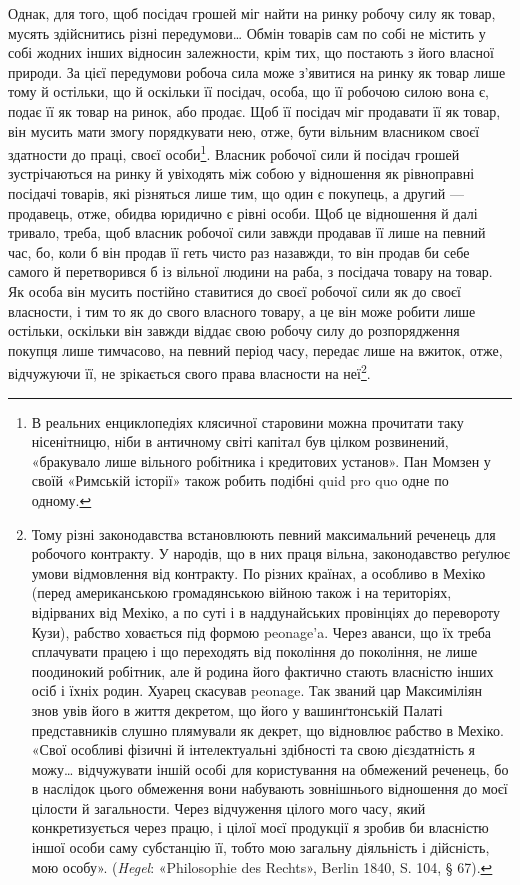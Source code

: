
Однак, для того, щоб посідач грошей міг найти на ринку
робочу силу як товар, мусять здійснитись різні передумови\dots{}
Обмін товарів сам по собі не містить у собі жодних інших відносин
залежности, крім тих, що постають з його власної природи.
За цієї передумови робоча сила може з’явитися на ринку як
товар лише тому й остільки, що й оскільки її посідач, особа, що
її робочою силою вона є, подає її як товар на ринок, або продає.
Щоб її посідач міг продавати її як товар, він мусить мати змогу
порядкувати нею, отже, бути вільним власником своєї здатности
до праці, своєї особи\footnote{
В реальних енциклопедіях клясичної старовини можна прочитати
таку нісенітницю, ніби в античному світі капітал був цілком розвинений,
«бракувало лише вільного робітника і кредитових установ». Пан Момзен
у своїй «Римській історії» також робить подібні quid pro quo одне
по одному.
}. Власник робочої сили й посідач грошей
зустрічаються на ринку й увіходять між собою у відношення
як рівноправні посідачі товарів, які різняться лише тим, що
один є покупець, а другий — продавець, отже, обидва юридично
є рівні особи. Щоб це відношення й далі тривало, треба, щоб
власник робочої сили завжди продавав її лише на певний час,
бо, коли б він продав її геть чисто раз назавжди, то він продав би
себе самого й перетворився б із вільної людини на раба, з посідача
товару на товар. Як особа він мусить постійно ставитися до
своєї робочої сили як до своєї власности, і тим то як до свого
власного товару, а це він може робити лише остільки, оскільки
він завжди віддає свою робочу силу до розпорядження покупця
лише тимчасово, на певний період часу, передає лише на вжиток,
отже, відчужуючи її, не зрікається свого права власности
на неї\footnote{
Тому різні законодавства встановлюють певний максимальний реченець
для робочого контракту. У народів, що в них праця вільна, законодавство
реґулює умови відмовлення від контракту. По різних країнах, а особливо
в Мехіко (перед американською громадянською війною також і на територіях,
відірваних від Мехіко, а по суті і в наддунайських провінціях до
перевороту Кузи), рабство ховається під формою peonage’a. Через аванси,
що їх треба сплачувати працею і що переходять від покоління до покоління,
не лише поодинокий робітник, але й родина його фактично стають
власністю інших осіб і їхніх родин. Хуарец скасував peonage. Так званий
цар Максиміліян знов увів його в життя декретом, що його у вашинґтонській
Палаті представників слушно плямували як декрет, що відновлює
рабство в Мехіко. «Свої особливі фізичні й інтелектуальні здібності та
свою дієздатність я можу\dots{} відчужувати іншій особі для користування
на обмежений реченець, бо в наслідок цього обмеження вони набувають
зовнішнього відношення до моєї цілости й загальности. Через відчуження
цілого мого часу, який конкретизується через працю, і цілої моєї продукції
я зробив би власністю іншої особи саму субстанцію її, тобто мою загальну
діяльність і дійсність, мою особу». (\emph{Hegel}: «Philosophie des Rechts», Berlin
1840, S. 104, § 67).
}.

